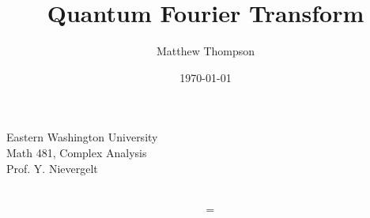 \documentclass{beamer}
\title{Quantum Fourier Transform}
\date{\today}
\author{Matthew Thompson}
\begin{document}
\maketitle

\begin{center}
    Eastern Washington University \\
    Math 481, Complex Analysis\\
    Prof. Y. Nievergelt\\
\end{center}

\section*{}
\emph{}
\subsection*{}

\begin{align*}
    &= \\
\end{align*}
\end{document}

